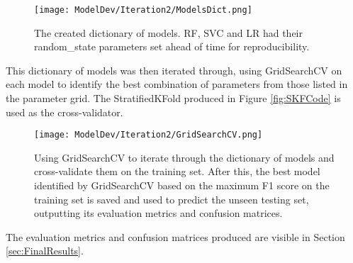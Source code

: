 \begin{figure}[H]
    \centering 
    \texttt{[image: ModelDev/Iteration2/ModelsDict.png]}
    \caption{The created dictionary of models. RF, SVC and LR had their random\_state parameters set ahead of time for reproducibility.}
    \label{fig:ModelDict}
\end{figure}

\para This dictionary of models was then iterated through, using GridSearchCV on each model to identify the best combination of parameters from 
those listed in the parameter grid. The StratifiedKFold produced in Figure \ref{fig:SKFCode} is used as the cross-validator.

\begin{figure}[H]
    \centering 
    \texttt{[image: ModelDev/Iteration2/GridSearchCV.png]}
    \caption{Using GridSearchCV to iterate through the dictionary of models and cross-validate them on the training set. After this, the best model 
    identified by GridSearchCV based on the maximum F1 score on the training set is saved and used to predict the unseen testing set, outputting 
    its evaluation metrics and confusion matrices.}
    \label{fig:GridSearchCV}
\end{figure}

\para The evaluation metrics and confusion matrices produced are visible in Section \ref{sec:FinalResults}.